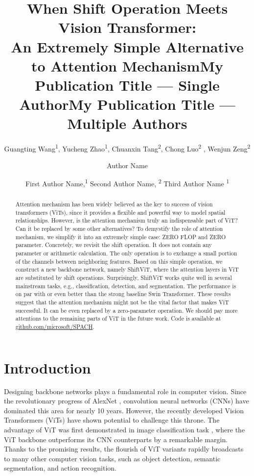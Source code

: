 \documentclass[letterpaper]{article} \usepackage{aaai22}  \usepackage{times}  \usepackage{helvet}  \usepackage{courier}  \usepackage[hyphens]{url}  \usepackage{graphicx} \usepackage{amsmath}
\title{When Shift Operation Meets Vision Transformer: \\ An Extremely Simple Alternative to Attention Mechanism}
\author{Guangting Wang\textsuperscript{\rm 1}\equalcontrib, Yucheng Zhao\textsuperscript{\rm 1}\equalcontrib, Chuanxin Tang\textsuperscript{\rm 2}\equalcontrib, Chong Luo\textsuperscript{\rm 2} \blfootnote{This work was done during the internship of Guangting and Yucheng at MSRA}, Wenjun Zeng\textsuperscript{\rm 2}}
\title{My Publication Title --- Single Author}
\author {
    Author Name
}
\title{My Publication Title --- Multiple Authors}
\author {
First Author Name,\textsuperscript{\rm 1}
    Second Author Name, \textsuperscript{\rm 2}
    Third Author Name \textsuperscript{\rm 1}
}
\begin{document}
\maketitle

\begin{abstract}


   Attention mechanism has been widely believed as the key to success of vision transformers (ViTs), since it provides a flexible and powerful way to model spatial relationships. However, is the attention mechanism truly an indispensable part of ViT? Can it be replaced by some other alternatives? To demystify the role of attention mechanism, we simplify it into an extremely simple case: ZERO FLOP and ZERO parameter. Concretely, we revisit the shift operation. It does not contain any parameter or arithmetic calculation. The only operation is to exchange a small portion of the channels between neighboring features. Based on this simple operation, we construct a new backbone network, namely ShiftViT, where the attention layers in ViT are substituted by shift operations. Surprisingly, ShiftViT works quite well in several mainstream tasks, e.g., classification, detection, and segmentation. The performance is on par with or even better than the strong baseline Swin Transformer. These results suggest that the attention mechanism might not be the vital factor that makes ViT successful. It can be even replaced by a zero-parameter operation. We should pay more attentions to the remaining parts of ViT in the future work. Code is available at \href{github.com/microsoft/SPACH}{github.com/microsoft/SPACH}.

\end{abstract}


\section{Introduction}

Designing backbone networks plays a fundamental role in computer vision. Since the revolutionary progress of AlexNet \cite{AlexNet}, convolution neural networks (CNNs) have dominated this area for nearly 10 years. However, the recently developed Vision Transformers (ViTs) have shown potential to challenge this throne. The advantage of ViT was first demonstrated in image classification task \cite{ViT}, where the ViT backbone outperforms its CNN counterparts by a remarkable margin. Thanks to the promising results, the flourish of ViT variants rapidly broadcasts to many other computer vision tasks, such as object detection, semantic segmentation, and action recognition.
\end{document}
